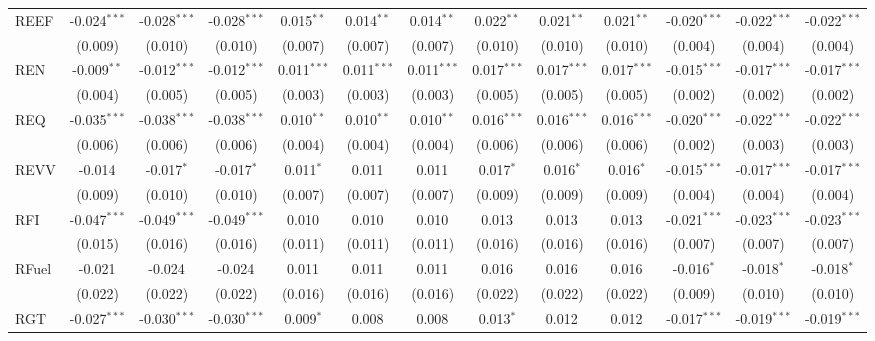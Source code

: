 \begin{table}[!htbp]
\begin{tabular}{@{\extracolsep{5pt}}lcccccccccccc}
 REEF & -0.024$^{***}$ & -0.028$^{***}$ & -0.028$^{***}$ & 0.015$^{**}$ & 0.014$^{**}$ & 0.014$^{**}$ & 0.022$^{**}$ & 0.021$^{**}$ & 0.021$^{**}$ & -0.020$^{***}$ & -0.022$^{***}$ & -0.022$^{***}$ \\
  & (0.009) & (0.010) & (0.010) & (0.007) & (0.007) & (0.007) & (0.010) & (0.010) & (0.010) & (0.004) & (0.004) & (0.004) \\
 REN & -0.009$^{**}$ & -0.012$^{***}$ & -0.012$^{***}$ & 0.011$^{***}$ & 0.011$^{***}$ & 0.011$^{***}$ & 0.017$^{***}$ & 0.017$^{***}$ & 0.017$^{***}$ & -0.015$^{***}$ & -0.017$^{***}$ & -0.017$^{***}$ \\
  & (0.004) & (0.005) & (0.005) & (0.003) & (0.003) & (0.003) & (0.005) & (0.005) & (0.005) & (0.002) & (0.002) & (0.002) \\
 REQ & -0.035$^{***}$ & -0.038$^{***}$ & -0.038$^{***}$ & 0.010$^{**}$ & 0.010$^{**}$ & 0.010$^{**}$ & 0.016$^{***}$ & 0.016$^{***}$ & 0.016$^{***}$ & -0.020$^{***}$ & -0.022$^{***}$ & -0.022$^{***}$ \\
  & (0.006) & (0.006) & (0.006) & (0.004) & (0.004) & (0.004) & (0.006) & (0.006) & (0.006) & (0.002) & (0.003) & (0.003) \\
 REVV & -0.014$^{}$ & -0.017$^{*}$ & -0.017$^{*}$ & 0.011$^{*}$ & 0.011$^{}$ & 0.011$^{}$ & 0.017$^{*}$ & 0.016$^{*}$ & 0.016$^{*}$ & -0.015$^{***}$ & -0.017$^{***}$ & -0.017$^{***}$ \\
  & (0.009) & (0.010) & (0.010) & (0.007) & (0.007) & (0.007) & (0.009) & (0.009) & (0.009) & (0.004) & (0.004) & (0.004) \\
 RFI & -0.047$^{***}$ & -0.049$^{***}$ & -0.049$^{***}$ & 0.010$^{}$ & 0.010$^{}$ & 0.010$^{}$ & 0.013$^{}$ & 0.013$^{}$ & 0.013$^{}$ & -0.021$^{***}$ & -0.023$^{***}$ & -0.023$^{***}$ \\
  & (0.015) & (0.016) & (0.016) & (0.011) & (0.011) & (0.011) & (0.016) & (0.016) & (0.016) & (0.007) & (0.007) & (0.007) \\
 RFuel & -0.021$^{}$ & -0.024$^{}$ & -0.024$^{}$ & 0.011$^{}$ & 0.011$^{}$ & 0.011$^{}$ & 0.016$^{}$ & 0.016$^{}$ & 0.016$^{}$ & -0.016$^{*}$ & -0.018$^{*}$ & -0.018$^{*}$ \\
  & (0.022) & (0.022) & (0.022) & (0.016) & (0.016) & (0.016) & (0.022) & (0.022) & (0.022) & (0.009) & (0.010) & (0.010) \\
 RGT & -0.027$^{***}$ & -0.030$^{***}$ & -0.030$^{***}$ & 0.009$^{*}$ & 0.008$^{}$ & 0.008$^{}$ & 0.013$^{*}$ & 0.012$^{}$ & 0.012$^{}$ & -0.017$^{***}$ & -0.019$^{***}$ & -0.019$^{***}$ \\

\end{tabular}
\end{table}
